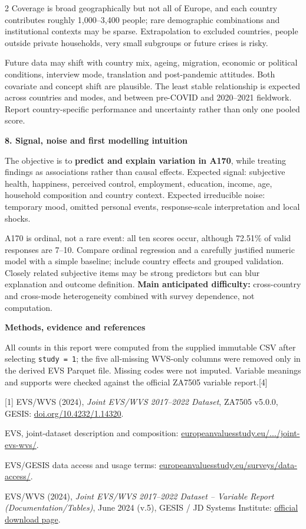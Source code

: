\documentclass[10pt,a4paper]{article}
\newcommand{\ReportSection}[2]{%
  \vspace{3pt}%
  {\fontsize{9.5}{10.5}\selectfont\bfseries\color{Navy}#1. #2}\par
  \vspace{1pt}%
}
\newcommand{\EvidenceHeading}{%
  \vspace{3pt}%
  {\fontsize{9.5}{10.5}\selectfont\bfseries\color{Navy}Methods, evidence and references}\par
  \vspace{1pt}%
}
\begin{document}
\begin{multicols}{2}
Coverage is broad geographically but not all of Europe, and each country contributes roughly 1,000--3,400 people; rare demographic combinations and institutional contexts may be sparse. Extrapolation to excluded countries, people outside private households, very small subgroups or future crises is risky.

\columnbreak

Future data may shift with country mix, ageing, migration, economic or political conditions, interview mode, translation and post-pandemic attitudes. Both covariate and concept shift are plausible. The least stable relationship is expected across countries and modes, and between pre-COVID and 2020--2021 fieldwork. Report country-specific performance and uncertainty rather than only one pooled score.

\ReportSection{8}{Signal, noise and first modelling intuition}
The objective is to \textbf{predict and explain variation in A170}, while treating findings as associations rather than causal effects. Expected signal: subjective health, happiness, perceived control, employment, education, income, age, household composition and country context. Expected irreducible noise: temporary mood, omitted personal events, response-scale interpretation and local shocks.

A170 is ordinal, not a rare event: all ten scores occur, although 72.51\% of valid responses are 7--10. Compare ordinal regression and a carefully justified numeric model with a simple baseline; include country effects and grouped validation. Closely related subjective items may be strong predictors but can blur explanation and outcome definition. \textbf{Main anticipated difficulty:} cross-country and cross-mode heterogeneity combined with survey dependence, not computation.

\EvidenceHeading
All counts in this report were computed from the supplied immutable CSV after selecting \texttt{study = 1}; the five all-missing WVS-only columns were removed only in the derived EVS Parquet file. Missing codes were not imputed. Variable meanings and supports were checked against the official ZA7505 variable report.[4]

{\fontsize{6.35}{7.5}\selectfont\color{Muted}
[1] EVS/WVS (2024), \textit{Joint EVS/WVS 2017--2022 Dataset}, ZA7505 v5.0.0, GESIS: \href{https://doi.org/10.4232/1.14320}{doi.org/10.4232/1.14320}.\par
[2] EVS, joint-dataset description and composition: \href{https://europeanvaluesstudy.eu/surveys/evs-wvs-collaborations/joint-evs-wvs/}{europeanvaluesstudy.eu/.../joint-evs-wvs/}.\par
[3] EVS/GESIS data access and usage terms: \href{https://europeanvaluesstudy.eu/surveys/data-access/}{europeanvaluesstudy.eu/surveys/data-access/}.\par
[4] EVS/WVS (2024), \textit{Joint EVS/WVS 2017--2022 Dataset -- Variable Report (Documentation/Tables)}, June 2024 (v.5), GESIS / JD Systems Institute: \href{https://www.worldvaluessurvey.org/WVSEVSjoint2017.jsp}{official download page}.
}

\end{multicols}
\end{document}
